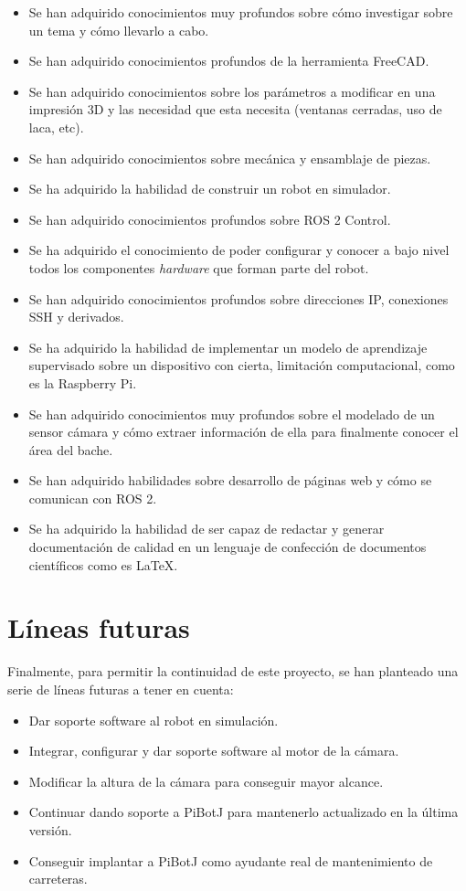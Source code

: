 \begin{itemize}
	\item Se han adquirido conocimientos muy profundos sobre cómo investigar sobre un tema y cómo llevarlo a cabo.
	\item Se han adquirido conocimientos profundos de la herramienta FreeCAD.
	\item Se han adquirido conocimientos sobre los parámetros a modificar en una impresión 3D y las necesidad que esta necesita (ventanas cerradas, uso de laca, etc).
	\item Se han adquirido conocimientos sobre mecánica y ensamblaje de piezas. 
	\item Se ha adquirido la habilidad de construir un robot en simulador.
	\item Se han adquirido conocimientos profundos sobre ROS 2 Control.
	\item Se ha adquirido el conocimiento de poder configurar y conocer a bajo nivel todos los componentes \textit{hardware} que forman parte del robot.
	\item Se han adquirido conocimientos profundos sobre direcciones IP, conexiones SSH y derivados.
	\item Se ha adquirido la habilidad de implementar un modelo de aprendizaje supervisado sobre un dispositivo con cierta, limitación computacional, como es la Raspberry Pi. 
	\item Se han adquirido conocimientos muy profundos sobre el modelado de un sensor cámara y cómo extraer información de ella para finalmente conocer el área del bache. 
	\item Se han adquirido habilidades sobre desarrollo de páginas web y cómo se comunican con ROS 2.
	\item Se ha adquirido la habilidad de ser capaz de redactar y generar documentación de calidad en un lenguaje de confección de documentos científicos como es LaTeX.
\end{itemize}
 


\section{Líneas futuras}

Finalmente, para permitir la continuidad de este proyecto, se han planteado una serie de líneas futuras a tener en cuenta: 

\begin{itemize}
	\item Dar soporte software al robot en simulación. 
	\item Integrar, configurar y dar soporte software al motor de la cámara.
	\item Modificar la altura de la cámara para conseguir mayor alcance.
	\item Continuar dando soporte a PiBotJ para mantenerlo actualizado en la última versión.
	\item Conseguir implantar a PiBotJ como ayudante real de mantenimiento de carreteras.
\end{itemize}

